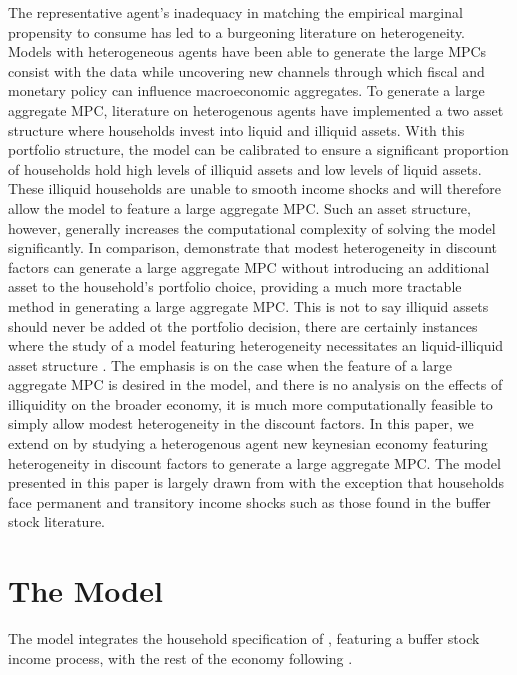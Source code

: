 \documentclass[titlepage]{\econtex}\providecommand{\texname}{BufferStockTheory}
\begin{document}
The representative agent's inadequacy in matching the empirical marginal propensity to consume has led to a burgeoning literature on heterogeneity. Models with heterogeneous agents have been able to generate the large MPCs consist with the data while uncovering new channels through which fiscal and monetary policy can influence macroeconomic aggregates. To generate a large aggregate MPC, literature on heterogenous agents have implemented a two asset structure where households invest into  liquid and illiquid assets. With this portfolio structure, the model can be calibrated to ensure a significant proportion of households hold high levels of  illiquid assets and low levels of liquid assets. These illiquid households are unable to smooth income shocks and will therefore allow the model to feature a large aggregate MPC. Such an asset structure, however, generally increases the computational complexity of solving the model significantly. In comparison,\cite{carroll2017distribution}  demonstrate that modest heterogeneity in discount factors can generate a large aggregate MPC without introducing an additional asset to the household's portfolio choice, providing a much more tractable method in generating a large aggregate MPC. This is not to say illiquid assets should never be added ot the portfolio decision, there are certainly instances where the study of a model featuring heterogeneity necessitates an liquid-illiquid asset structure \cite{bayer2019precautionary}. The emphasis is on the case when the feature of a large aggregate MPC is desired in the model, and there is no analysis on the effects of illiquidity on the broader economy, it is much more computationally feasible to simply allow modest heterogeneity in the discount factors. In this paper, we extend on \cite{carroll2017distribution} by studying a heterogenous agent new keynesian economy featuring heterogeneity in discount factors to generate a large aggregate MPC. The model presented in this paper is largely drawn from \cite{auclert2020micro}  with the exception that households face permanent and transitory income shocks such as those found in the buffer stock literature.  


\hypertarget{The-Model}{}
\section{The Model}

The model integrates the household specification of \cite{carroll2017distribution}, featuring a buffer stock income process, with the rest of the economy following \cite{auclert2020micro}. 
\end{document}
